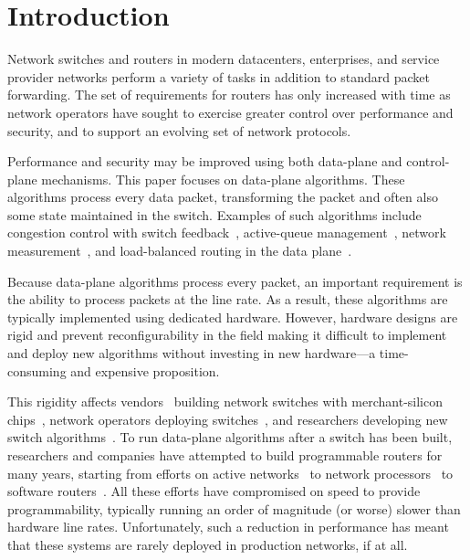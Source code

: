 \section{Introduction}
\label{s:intro}

Network switches and routers in modern datacenters, enterprises, and service
provider networks perform a variety of tasks in addition to standard packet
forwarding. The set of requirements for routers has only increased with time as
network operators have sought to exercise greater control over performance and
security, and to support an evolving set of network protocols.

Performance and security may be improved using both data-plane and
control-plane mechanisms. This paper focuses on data-plane algorithms. These
algorithms process every data packet, transforming the packet and often also
some state maintained in the switch.  Examples of such algorithms include
congestion control with switch feedback~\cite{xcp, rcp, pdq, dctcp},
active-queue management~\cite{red,blue,avq,codel,pie}, network
measurement~\cite{opensketch, bitmap_george, elephant_george}, and
load-balanced routing in the data plane~\cite{conga}.

Because data-plane algorithms process every packet, an important requirement is
the ability to process packets at the line rate.  As a result, these algorithms
are typically implemented using dedicated hardware. However, hardware designs
are rigid and prevent reconfigurability in the field making it difficult to
implement and deploy new algorithms without investing in new hardware---a
time-consuming and expensive proposition.

This rigidity affects vendors~\cite{cisco_nexus, dell_force10, arista_7050}
building network switches with merchant-silicon chips~\cite{trident, tomahawk,
mellanox}, network operators deploying switches~\cite{google,facebook,vl2}, and
researchers developing new switch algorithms~\cite{xcp, codel, d3, detail,
pdq}.  To run data-plane algorithms after a switch has been built, researchers
and companies have attempted to build programmable routers for many years,
starting from efforts on active networks~\cite{active-nets} to network
processors~\cite{npu_survey} to software routers~\cite{click,routebricks}. All
these efforts have compromised on speed to provide programmability, typically
running an order of magnitude (or worse) slower than hardware line rates.
Unfortunately, such a reduction in performance has meant that these systems are
rarely deployed in production networks, if at all.

